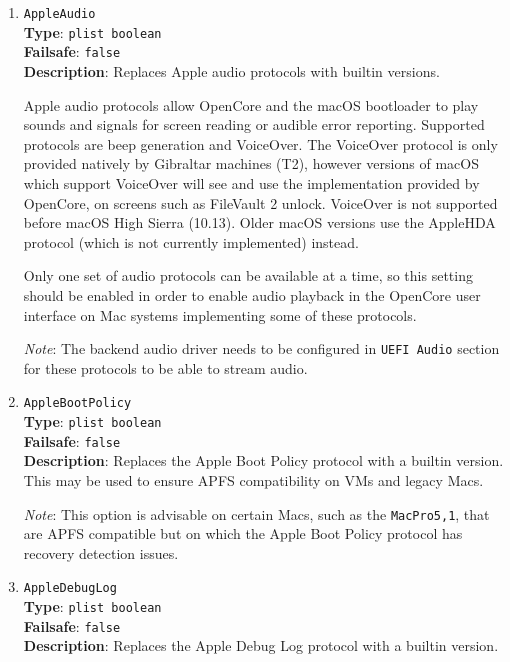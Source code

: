 \documentclass[]{article}
\begin{document}
\begin{enumerate}

\item
  \texttt{AppleAudio}\\
  \textbf{Type}: \texttt{plist\ boolean}\\
  \textbf{Failsafe}: \texttt{false}\\
  \textbf{Description}: Replaces Apple audio protocols with builtin
  versions.

  Apple audio protocols allow OpenCore and the macOS bootloader to play
  sounds and signals for screen reading or audible error reporting.
  Supported protocols are beep generation and VoiceOver. The VoiceOver protocol
  is only provided natively by Gibraltar machines (T2), however versions of macOS
  which support VoiceOver will see and use the implementation provided by OpenCore,
  on screens such as FileVault 2 unlock. VoiceOver is not supported before
  macOS High Sierra (10.13). Older macOS versions use the AppleHDA protocol
  (which is not currently implemented) instead.

  Only one set of audio protocols can be available at a time, so this setting should
  be enabled in order to enable audio playback in the OpenCore user interface on Mac
  systems implementing some of these protocols.

  \emph{Note}: The backend audio driver needs to be configured in \texttt{UEFI Audio}
  section for these protocols to be able to stream audio.

\item
  \texttt{AppleBootPolicy}\\
  \textbf{Type}: \texttt{plist\ boolean}\\
  \textbf{Failsafe}: \texttt{false}\\
  \textbf{Description}: Replaces the Apple Boot Policy protocol with a builtin
  version. This may be used to ensure APFS compatibility on VMs and legacy Macs.

  \emph{Note}: This option is advisable on certain Macs, such as
  the \texttt{MacPro5,1}, that are APFS compatible but on which
  the Apple Boot Policy protocol has recovery detection issues.

\item
  \texttt{AppleDebugLog}\\
  \textbf{Type}: \texttt{plist\ boolean}\\
  \textbf{Failsafe}: \texttt{false}\\
  \textbf{Description}: Replaces the Apple Debug Log protocol with a builtin
  version.


\end{enumerate}
\end{document}
